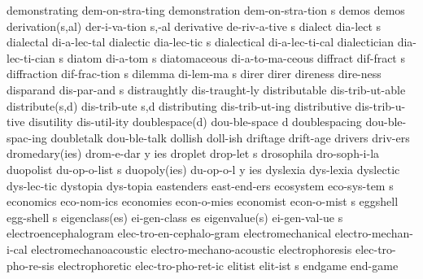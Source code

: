 \NewWordtrue
\1 demonstrating        dem-on-stra-ting	%
\NewWordtrue
\5 demonstration	dem-on-stra-tion s	%
\1 demos		demos	
\2 derivation(s,al)	der-i-va-tion s,-al	%
\5 derivative		de-riv-a-tive s
\NewWordtrue
\5 dialect		dia-lect s		%
\NewWordtrue
\1 dialectal	 	di-a-lec-tal		%
\5 dialectic		dia-lec-tic s		%
\NewWordtrue
\1 dialectical	 	di-a-lec-ti-cal		%
\5 dialectician		dia-lec-ti-cian s	%
\NewWordtrue
\5 diatom		di-a-tom s		%
\NewWordtrue
\1 diatomaceous 	di-a-to-ma-ceous	%
\5 diffract		dif-fract s
\5 diffraction		dif-frac-tion s		%
\NewWordtrue
\5 dilemma		di-lem-ma s		%
\1 direr		direr
\1 direness		dire-ness
\5 disparand		dis-par-and s
\1 distraughtly		dis-traught-ly
\1 distributable	dis-trib-ut-able	%
\2 distribute(s,d)	dis-trib-ute s,d
\NewWordtrue
\1 distributing 	dis-trib-ut-ing		%
\1 distributive 	dis-trib-u-tive 	%
\NewWordtrue
\1 disutility		dis-util-ity		%
\2 doublespace(d)	dou-ble-space d
\1 doublespacing	dou-ble-spac-ing
\1 doubletalk		dou-ble-talk		%
\1 dollish		doll-ish
\1 driftage		drift-age
\1 drivers		driv-ers		%
\3 dromedary(ies)	drom-e-dar y ies
\5 droplet		drop-let s		%
\NewWordtrue
\1 drosophila		dro-soph-i-la		%
\5 duopolist		du-op-o-list s
\3 duopoly(ies)		du-op-o-l y ies
\1 dyslexia		dys-lexia		%
\1 dyslectic		dys-lec-tic		%
\1 dystopia		dys-topia		%
\1 eastenders		east-end-ers
\5 ecosystem		eco-sys-tem s		%
\1 economics		eco-nom-ics
\1 economies		econ-o-mies		%
\5 economist		econ-o-mist s
\NewWordtrue
\5 eggshell		egg-shell s		%
\2 eigenclass(es)	ei-gen-class es		%
\2 eigenvalue(s)	ei-gen-val-ue s		%
\NewWordtrue
\1 electroencephalogram  elec-tro-en-cephalo-gram
\1 electromechanical	electro-mechan-i-cal
\1 electromechanoacoustic  electro-mechano-acoustic
\1 electrophoresis	elec-tro-pho-re-sis	%
\1 electrophoretic	elec-tro-pho-ret-ic	%
\5 elitist		elit-ist s
\NewWordtrue
\1 endgame		end-game		%
